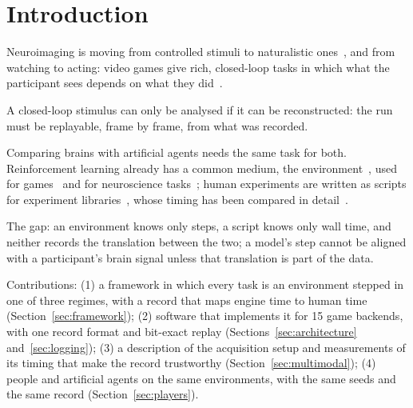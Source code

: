 \section{Introduction}
\label{sec:introduction}

\begin{outline}
  \item Neuroimaging is moving from controlled stimuli to naturalistic ones~\citep{sonkusare2019naturalistic,nastase2020keepitreal}, and from watching to acting: video games give rich, closed-loop tasks in which what the participant sees depends on what they did~\citep{cross2021deep,tomov2023neural,harel2023controller,boyle2025cneuromod}.
  \item A closed-loop stimulus can only be analysed if it can be reconstructed: the run must be replayable, frame by frame, from what was recorded.
  \item Comparing brains with artificial agents needs the same task for both. Reinforcement learning already has a common medium, the environment~\citep{brockman2016gym,towers2024gymnasium}, used for games~\citep{bellemare2013ale,mnih2015dqn} and for neuroscience tasks~\citep{molanomazon2022neurogym}; human experiments are written as scripts for experiment libraries~\citep{peirce2019psychopy,pallier2026goxpyriment}, whose timing has been compared in detail~\citep{bridges2020timing}.
  \item The gap: an environment knows only steps, a script knows only wall time, and neither records the translation between the two; a model's step cannot be aligned with a participant's brain signal unless that translation is part of the data.
  \item Contributions: (1) a framework in which every task is an environment stepped in one of three regimes, with a record that maps engine time to human time (Section~\ref{sec:framework}); (2) software that implements it for 15 game backends, with one record format and bit-exact replay (Sections~\ref{sec:architecture} and~\ref{sec:logging}); (3) a description of the acquisition setup and measurements of its timing that make the record trustworthy (Section~\ref{sec:multimodal}); (4) people and artificial agents on the same environments, with the same seeds and the same record (Section~\ref{sec:players}).
\end{outline}
